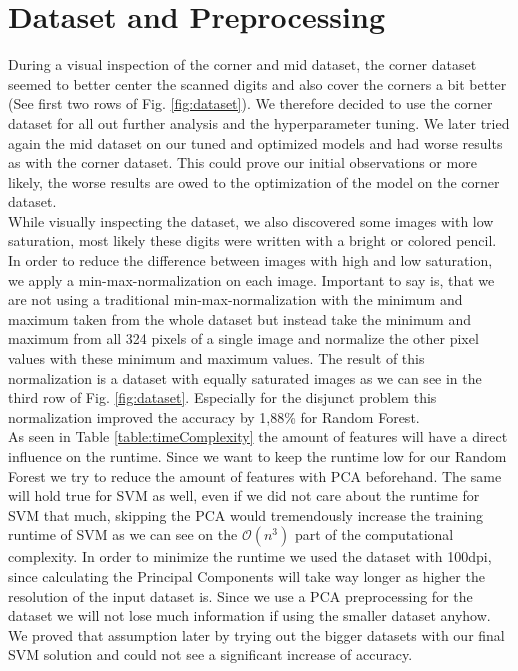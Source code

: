 \documentclass[conference]{IEEEtran}
\begin{document}
\section{Dataset and Preprocessing}
\textcolor{til}{
    During a visual inspection of the corner and mid dataset, the corner dataset seemed to better center the scanned digits and also cover the corners a bit better (See first two rows of Fig. \ref{fig:dataset}). We therefore decided to use the corner dataset for all out further analysis and the hyperparameter tuning. We later tried again the mid dataset on our tuned and optimized models and had worse results as with the corner dataset. This could prove our initial observations or more likely, the worse results are owed to the optimization of the model on the corner dataset. \\
    While visually inspecting the dataset, we also discovered some images with low saturation, most likely these digits were written with a bright or colored pencil. In order to reduce the difference between images with high and low saturation, we apply a min-max-normalization on each image. Important to say is, that we are not using a traditional min-max-normalization with the minimum and maximum taken from the whole dataset but instead take the minimum and maximum from all 324 pixels of a single image and normalize the other pixel values with these minimum and maximum values. The result of this normalization is a dataset with equally saturated images as we can see in the third row of Fig. \ref{fig:dataset}. Especially for the disjunct problem this normalization improved the accuracy by 1,88\% for Random Forest. \\
    As seen in Table \ref{table:timeComplexity} the amount of features will have a direct influence on the runtime. Since we want to keep the runtime low for our Random Forest we try to reduce the amount of features with PCA beforehand. The same will hold true for SVM as well, even if we did not care about the runtime for SVM that much, skipping the PCA would tremendously increase the training runtime of SVM as we can see on the $\mathcal{O}(n^3)$ part of the computational complexity. In order to minimize the runtime we used the dataset with 100dpi, since calculating the Principal Components will take way longer as higher the resolution of the input dataset is. Since we use a PCA preprocessing for the dataset we will not lose much information if using the smaller dataset anyhow. We proved that assumption later by trying out the bigger datasets with our final SVM solution and could not see a significant increase of accuracy.}
\end{document}

